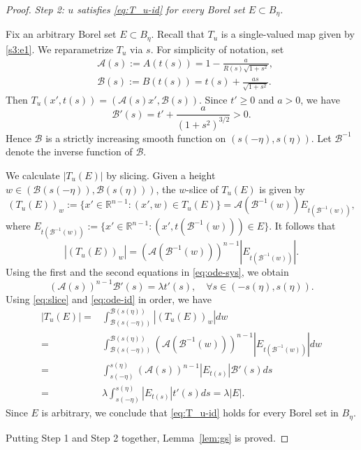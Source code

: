 \documentclass[10pt,a4paper]{amsart}
\newcommand{\R}{\mathbb{R}}
\begin{document}
\begin{proof}
    {\it Step 2: $u$ satisfies \eqref{eq:T_u-id} for every Borel set $E\subset B_\eta$.}

    Fix an arbitrary Borel set $E\subset B_\eta$.
    Recall that $T_u$ is a single-valued map given by \eqref{s3:e1}.
    We reparametrize $T_u$ via $s$.
    For simplicity of notation, set
    \begin{align*}
        &\mathcal{A}(s):=A(t(s))=1-\frac{a}{R(s)\sqrt{1+s^2}},\\
    &\mathcal{B}(s):=B(t(s))=t(s)+\frac{as}{\sqrt{1+s^2}}.
    \end{align*}
    Then $T_u(x',t(s))=(\mathcal{A}(s)x',\mathcal{B}(s))$.
    Since $t'\geq 0$ and $a>0$, we have
    \[
    \mathcal{B}'(s)=t'+\frac{a}{(1+s^2)^{3/2}}>0.
    \]
    Hence $\mathcal{B}$ is a strictly increasing smooth function on $(s(-\eta),s(\eta))$.
    Let $\mathcal{B}^{-1}$ denote the inverse function of $\mathcal{B}$.

    We calculate $|T_u(E)|$ by slicing.
    Given a height $w\in(\mathcal{B}(s(-\eta)),\mathcal{B}(s(\eta)))$, the $w$-slice of $T_u(E)$ is given by
    \[
    (T_u(E))_w:=\{x'\in\R^{n-1}:(x',w)\in T_u(E)\}=\mathcal{A}(\mathcal{B}^{-1}(w))E_{t(\mathcal{B}^{-1}(w))},
    \]
    where $E_{t(\mathcal{B}^{-1}(w))}:=\{x'\in\R^{n-1}:(x',t(\mathcal{B}^{-1}(w)))\in E\}$.
    It follows that
    \begin{equation}\label{eq:slice}
        |(T_u(E))_w|=(\mathcal{A}(\mathcal{B}^{-1}(w)))^{n-1}|E_{t(\mathcal{B}^{-1}(w))}|.
    \end{equation}
    Using the first and the second equations in \eqref{eq:ode-sys}, we obtain
   \begin{equation}\label{eq:ode-id}
    (\mathcal{A}(s))^{n-1}\mathcal{B}'(s)=\lambda t'(s),\quad\forall s\in(-s(\eta),s(\eta)).
   \end{equation}
   Using \eqref{eq:slice} and \eqref{eq:ode-id} in order, we have
   \begin{align*}
    |T_u(E)|=&\int_{\mathcal{B}(s(-\eta))}^{\mathcal{B}(s(\eta))}|(T_u(E))_w|dw\\
    =&\int_{\mathcal{B}(s(-\eta))}^{\mathcal{B}(s(\eta))}(\mathcal{A}(\mathcal{B}^{-1}(w)))^{n-1}|E_{t(\mathcal{B}^{-1}(w))}|dw\\
    =&\int_{s(-\eta)}^{s(\eta)}(\mathcal{A}(s))^{n-1}|E_{t(s)}|\mathcal{B}'(s)ds\\
    =&\lambda\int_{s(-\eta)}^{s(\eta)}|E_{t(s)}|t'(s)ds=\lambda|E|.
   \end{align*}
   Since $E$ is arbitrary, we conclude that \eqref{eq:T_u-id} holds for every Borel set in $B_\eta$.

   Putting Step 1 and Step 2 together, Lemma~\ref{lem:gs} is proved.
\end{proof}
\end{document}
